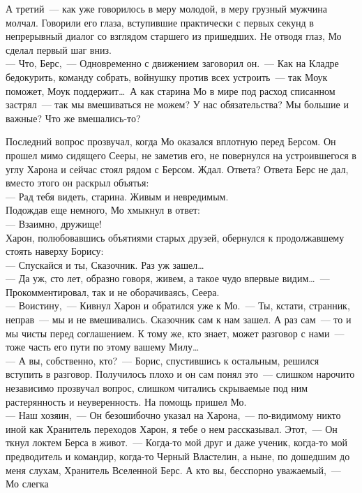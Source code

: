 А третий~--- как уже говорилось в меру молодой, в меру грузный мужчина молчал. 
Говорили его глаза, вступившие практически с первых секунд в непрерывный диалог 
со взглядом старшего из пришедших. Не отводя глаз, Мо сделал первый шаг вниз.\\
--- Что, Берс,~--- Одновременно с движением заговорил он.~--- Как на Кладре 
бедокурить, команду собрать, войнушку против всех устроить~--- так Моук 
поможет, Моук поддержит\ldots\ А как старина Мо в мире под расход списанном застрял~--- 
так мы вмешиваться не можем? У нас обязательства? Мы большие и важные? Что же 
вмешались-то?

Последний вопрос прозвучал, когда Мо оказался вплотную перед Берсом. Он прошел 
мимо сидящего Сееры, не заметив его, не повернулся на устроившегося в углу 
Харона и сейчас стоял рядом с Берсом. Ждал. Ответа? Ответа Берс не дал, вместо 
этого он раскрыл объятья:\\
--- Рад тебя видеть, старина. Живым и невредимым.\\
Подождав еще немного, Мо хмыкнул в ответ:\\
--- Взаимно, дружище!\\
Харон, полюбовавшись объятиями старых друзей, обернулся к продолжавшему стоять 
наверху Борису:\\
--- Спускайся и ты, Сказочник. Раз уж зашел\ldots\\
--- Да уж, сто лет, образно говоря, живем, а такое чудо впервые видим\ldots~--- 
Прокомментировал, так и не оборачиваясь, Сеера. \\
--- Воистину,~--- Кивнул Харон и обратился уже к Мо.~--- Ты, кстати, странник, 
неправ~--- мы и не вмешивались. Сказочник сам к нам зашел. А раз сам~--- то и мы чисты 
перед соглашением. К тому же, кто знает, может разговор с нами~--- тоже часть 
его пути по этому вашему Милу\ldots\\
--- А вы, собственно, кто?~--- Борис, спустившись к остальным, решился вступить в 
разговор. Получилось плохо и он сам понял это~--- слишком нарочито независимо 
прозвучал вопрос, слишком читались скрываемые под ним растерянность и 
неуверенность. На помощь пришел Мо.\\
--- Наш хозяин,~--- Он безошибочно указал на Харона,~--- по-видимому никто иной 
как Хранитель переходов Харон, я тебе о нем рассказывал. Этот,~--- Он ткнул локтем 
Берса в живот.~--- Когда-то мой друг и даже ученик, когда-то мой предводитель и 
командир, когда-то Черный Властелин, а ныне, по дошедшим до меня слухам, 
Хранитель Вселенной Берс. А кто вы, бесспорно уважаемый,~--- Мо слегка 
